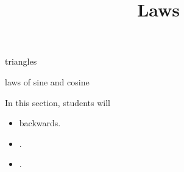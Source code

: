 \documentclass{ximera}
\title{Laws}
\begin{document}
\begin{abstract}
%
\end{abstract}
\maketitle





triangles

laws of sine and cosine










\begin{sectionOutcomes}
In this section, students will 

\begin{itemize}
\item backwards.
\item .
\item .
\end{itemize}
\end{sectionOutcomes}
\end{document}
